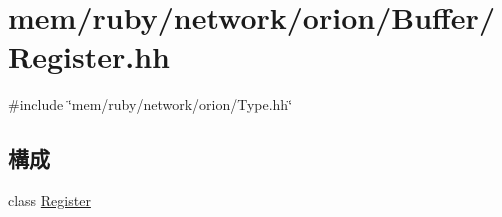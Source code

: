 \hypertarget{Register_8hh}{
\section{mem/ruby/network/orion/Buffer/Register.hh}
\label{Register_8hh}
}
{\ttfamily \#include \char`\"{}mem/ruby/network/orion/Type.hh\char`\"{}}\par
\subsection*{構成}
\begin{DoxyCompactItemize}
\item 
class \hyperlink{classRegister}{Register}
\end{DoxyCompactItemize}
